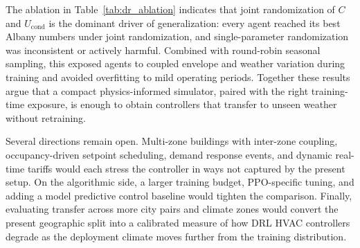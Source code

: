 \documentclass[conference]{IEEEtran}
\begin{document}
The ablation in Table~\ref{tab:dr_ablation} indicates that joint
randomization of $C$ and $U_{\text{cond}}$ is the dominant driver of
generalization: every agent reached its best Albany numbers under joint
randomization, and single-parameter randomization was inconsistent or
actively harmful. Combined with round-robin seasonal sampling, this
exposed agents to coupled envelope and weather variation during
training and avoided overfitting to mild operating periods. Together
these results argue that a compact physics-informed simulator, paired
with the right training-time exposure, is enough to obtain controllers
that transfer to unseen weather without retraining.

Several directions remain open. Multi-zone buildings with inter-zone
coupling, occupancy-driven setpoint scheduling, demand response events,
and dynamic real-time tariffs would each stress the controller in ways
not captured by the present setup. On the algorithmic side, a larger
training budget, PPO-specific tuning, and adding a model predictive
control baseline would tighten the comparison. Finally, evaluating
transfer across more city pairs and climate zones would convert the
present geographic split into a calibrated measure of how DRL HVAC
controllers degrade as the deployment climate moves further from the
training distribution.



\end{document}
